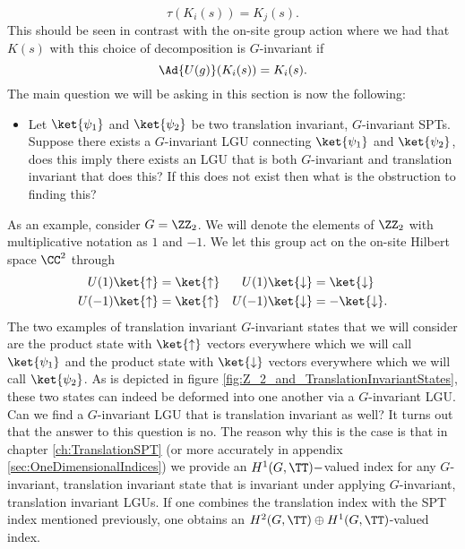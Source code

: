 \begin{equation}
\tau(K_i(s))=K_j(s).
\end{equation}
This should be seen in contrast with the on-site group action where we had that $K(s)$ with this choice of decomposition is $G$-invariant if
\begin{equation}
\Ad{U(g)}(K_i(s))=K_i(s).
\end{equation}
The main question we will be asking in this section is now the following:
\begin{itemize}
	\item Let $\ket{\psi_1}$ and $\ket{\psi_2}$ be two translation invariant, $G$-invariant SPTs. Suppose there exists a $G$-invariant LGU connecting $\ket{\psi_1}$ and $\ket{\psi_2}$, does this imply there exists an LGU that is both $G$-invariant and translation invariant that does this? If this does not exist then what is the obstruction to finding this?
\end{itemize}
As an example, consider $G=\ZZ_2$. We will denote the elements of $\ZZ_2$ with multiplicative notation as $1$ and $-1$. We let this group act on the on-site Hilbert space $\CC^2$ through
\begin{align}
U(1)\ket{\uparrow}&=\ket{\uparrow}&U(1)\ket{\downarrow}&=\ket{\downarrow}\\
U(-1)\ket{\uparrow}&=\ket{\uparrow}&U(-1)\ket{\downarrow}&=-\ket{\downarrow}.
\end{align}
The two examples of translation invariant $G$-invariant states that we will consider are the product state with $\ket{\uparrow}$ vectors everywhere which we will call $\ket{\psi_1}$ and the product state with $\ket{\downarrow}$ vectors everywhere which we will call $\ket{\psi_2}$. As is depicted in figure \ref{fig:Z_2_and_TranslationInvariantStates}, these two states can indeed be deformed into one another via a $G$-invariant LGU. Can we find a $G$-invariant LGU that is translation invariant as well? It turns out that the answer to this question is no. The reason why this is the case is that in chapter \ref{ch:TranslationSPT} (or more accurately in appendix \ref{sec:OneDimensionalIndices}) we provide an $H^1(G,\TT)-$valued index for any $G$-invariant, translation invariant state that is invariant under applying $G$-invariant, translation invariant LGUs. If one combines the translation index with the SPT index mentioned previously, one obtains an $H^2(G,\TT)\oplus H^1(G,\TT)$-valued index.
